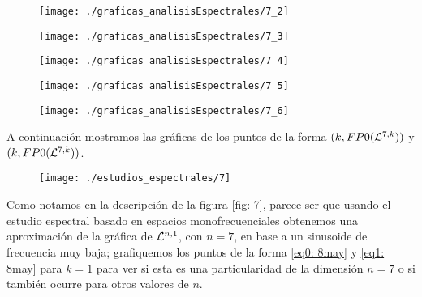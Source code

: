 \begin{figure}[H]
	\sidecaption{
	\label{fig: 7_2}
	}
	\centering
	\texttt{[image: ./graficas\_analisisEspectrales/7\_2]} 
\end{figure}	


\begin{figure}[H]
	\sidecaption{
	\label{fig: 7_3}
	}
	\centering
	\texttt{[image: ./graficas\_analisisEspectrales/7\_3]} 
\end{figure}	


\begin{figure}[H]
	\sidecaption{
	\label{fig: 7_4}
	}
	\centering
	\texttt{[image: ./graficas\_analisisEspectrales/7\_4]} 
\end{figure}	


\begin{figure}[H]
	\sidecaption{
	\label{fig: 7_5}
	}
	\centering
	\texttt{[image: ./graficas\_analisisEspectrales/7\_5]} 
\end{figure}	


\begin{figure}[H]
	\sidecaption{
	\label{fig: 7_6}
	}
	\centering
	\texttt{[image: ./graficas\_analisisEspectrales/7\_6]} 
\end{figure}	

A continuación mostramos las gráficas de los puntos
de la forma $(k, FP0(\mathcal{L}^{7,k}))$
y $(k, FP0(\mathcal{L}^{7,k}))$.
\begin{figure}[H]
	\centering
	\texttt{[image: ./estudios\_espectrales/7]} 
\end{figure}	

Como notamos en la descripción de la figura
\ref{fig: 7}, parece ser que usando el estudio espectral basado en 
espacios monofrecuenciales obtenemos una aproximación de la gráfica
de $\mathcal{L}^{n,1}$, con $n=7$, en base a un sinusoide de frecuencia muy baja;
grafiquemos 
los puntos de la forma
\eqref{eq0: 8may} y \eqref{eq1: 8may} para 
$k=1$
para ver si esta es una particularidad de la dimensión
$n=7$ o si también ocurre para otros valores de $n$.

